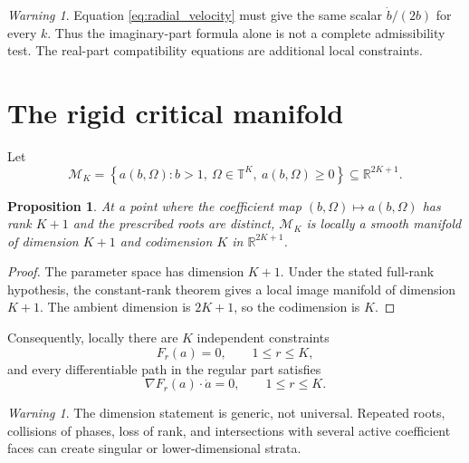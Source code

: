 \documentclass[11pt]{amsart}
\numberwithin{equation}{section}
\theoremstyle{plain}
\newtheorem{proposition}[theorem]{Proposition}
\theoremstyle{definition}
\theoremstyle{remark}
\newtheorem{warning}[theorem]{Warning}
\begin{document}
\begin{warning}
\label{warn:radial_compatibility}
Equation \eqref{eq:radial_velocity} must give the same scalar $\dot b/(2b)$ for every $k$.  Thus the imaginary-part formula alone is not a complete admissibility test.  The real-part compatibility equations are additional local constraints.
\end{warning}

\section{The rigid critical manifold}
\label{sec:critical_manifold}

Let
\begin{equation}
\mathcal M_K
=
\left\{
a(b,\Omega):
 b>1,\ \Omega\in\mathbb T^K,
\ a(b,\Omega)\geq0
\right\}
\subseteq\mathbb R^{2K+1}.
\label{eq:rigid_critical_set}
\end{equation}

\begin{proposition}
\label{prop:generic_dimension}
At a point where the coefficient map $(b,\Omega)\mapsto a(b,\Omega)$ has rank $K+1$ and the prescribed roots are distinct, $\mathcal M_K$ is locally a smooth manifold of dimension $K+1$ and codimension $K$ in $\mathbb R^{2K+1}$.
\end{proposition}

\begin{proof}
The parameter space has dimension $K+1$.  Under the stated full-rank hypothesis, the constant-rank theorem gives a local image manifold of dimension $K+1$.  The ambient dimension is $2K+1$, so the codimension is $K$.
\end{proof}

Consequently, locally there are $K$ independent constraints
\begin{equation}
F_r(a)=0,
\qquad 1\leq r\leq K,
\label{eq:implicit_constraints}
\end{equation}
and every differentiable path in the regular part satisfies
\begin{equation}
\nabla F_r(a)\cdot\dot a=0,
\qquad 1\leq r\leq K.
\label{eq:tangent_equalities}
\end{equation}

\begin{warning}
\label{warn:singular_manifold}
The dimension statement is generic, not universal.  Repeated roots, collisions of phases, loss of rank, and intersections with several active coefficient faces can create singular or lower-dimensional strata.
\end{warning}
\end{document}

